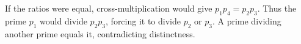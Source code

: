If the ratios were equal, cross-multiplication would give $p_1p_4=p_2p_3$. Thus the prime $p_1$ would divide $p_2p_3$, forcing it to divide $p_2$ or $p_3$. A prime dividing another prime equals it, contradicting distinctness.
